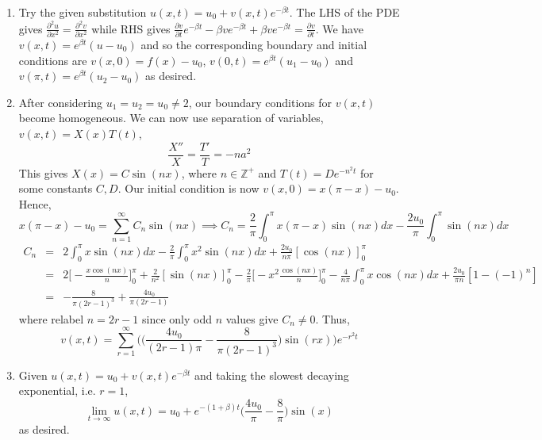 \documentclass[a4paper]{article}
\begin{document}
\begin{ans}\leavevmode
\begin{enumerate}[label=(\alph*)]
    \item Try the given substitution $u(x,t)=u_0+v(x,t)e^{-\beta t}$. The LHS of the PDE gives $\frac{\partial^2u}{\partial x^2}=\frac{\partial^2v}{\partial x^2}$ while RHS gives $\frac{\partial v}{\partial t}e^{-\beta t}-\beta ve^{-\beta t}+\beta ve^{-\beta t}=\frac{\partial v}{\partial t}$. We have $v(x,t)=e^{\beta t}(u-u_0)$ and so the corresponding boundary and initial conditions are $v(x,0)=f(x)-u_0$, $v(0,t)=e^{\beta t}(u_1-u_0)$ and $v(\pi,t)=e^{\beta t}(u_2-u_0)$ as desired.
    \item  After considering $u_1=u_2=u_0\neq 2$, our boundary conditions for $v(x,t)$ become homogeneous. We can now use separation of variables, $v(x,t)=X(x)T(t)$,
$$\frac{X''}{X}=\frac{T'}{T}=-na^2$$
This gives $X(x)=C\sin(nx)$, where $n\in\mathbb{Z}^+$ and $T(t)=De^{-n^2t}$ for some constants $C,D$. Our initial condition is now $v(x,0)=x(\pi-x)-u_0$. Hence,
$$x(\pi-x)-u_0=\sum_{n=1}^\infty C_n\sin(nx)\implies C_n=\frac{2}{\pi}\int_{0}^\pi x(\pi-x)\sin(nx)dx-\frac{2u_0}{\pi}\int_{0}^{\pi}\sin(nx)dx$$
\begin{eqnarray}
 C_n&=&2\int_0^\pi x\sin(nx)dx-\frac{2}{\pi}\int_0^\pi x^2\sin(nx)dx+\frac{2u_0}{n\pi}[\cos(nx)]_{0}^\pi\nonumber\\&=&2\bigg[-\frac{x\cos(nx)}{n}\bigg]_{0}^\pi+\frac{2}{n^2}[\sin(nx)]_{0}^\pi-\frac{2}{\pi}\bigg[-x^2\frac{\cos(nx)}{n}\bigg]_{0}^\pi-\frac{4}{n\pi }\int_{0}^\pi x\cos(nx)dx+\frac{2u_0}{\pi n}[1-(-1)^n]\nonumber\\&=&-\frac{8}{\pi(2r-1)^3}+\frac{4u_0}{\pi(2r-1)}\nonumber
\end{eqnarray}
where relabel $n=2r-1$ since only odd $n$ values give $C_n\neq 0$. Thus, 
$$v(x,t)=\sum_{r=1}^\infty\bigg(\bigg(\frac{4u_0}{(2r-1)\pi}-\frac{8}{\pi(2r-1)^3}\bigg)\sin(r x)\bigg)e^{-r^2t}$$
\item Given $u(x,t)=u_0+v(x,t)e^{-\beta t}$ and taking the slowest decaying exponential, i.e. $r=1$,
$$\lim_{t\rightarrow\infty}u(x,t)=u_0+e^{-(1+\beta)t}\bigg(\frac{4u_0}{\pi}-\frac{8}{\pi}\bigg)\sin(x)$$
as desired.
\end{enumerate}
\end{ans}
\end{document}
